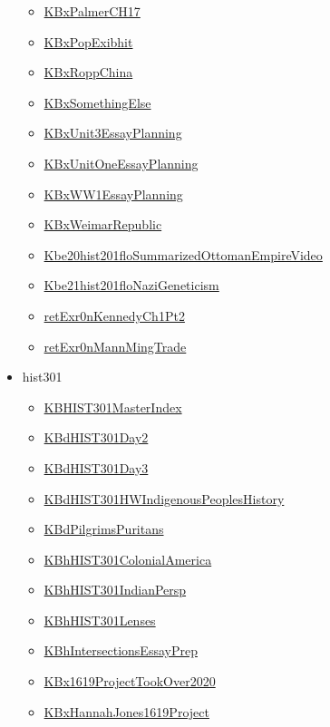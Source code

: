 \documentclass[11pt]{article}
\begin{document}
\begin{itemize}
\begin{itemize}
\item \href{hist201/KBxPalmerCH17.org}{KBxPalmerCH17}
\item \href{hist201/KBxPopExibhit.org}{KBxPopExibhit}
\item \href{hist201/KBxRoppChina.org}{KBxRoppChina}
\item \href{hist201/KBxSomethingElse.org}{KBxSomethingElse}
\item \href{hist201/KBxUnit3EssayPlanning.org}{KBxUnit3EssayPlanning}
\item \href{hist201/KBxUnitOneEssayPlanning.org}{KBxUnitOneEssayPlanning}
\item \href{hist201/KBxWW1EssayPlanning.org}{KBxWW1EssayPlanning}
\item \href{hist201/KBxWeimarRepublic.org}{KBxWeimarRepublic}
\item \href{hist201/Kbe20hist201floSummarizedOttomanEmpireVideo.org}{Kbe20hist201floSummarizedOttomanEmpireVideo}
\item \href{hist201/Kbe21hist201floNaziGeneticism.org}{Kbe21hist201floNaziGeneticism}
\item \href{hist201/retExr0nKennedyCh1Pt2.org}{retExr0nKennedyCh1Pt2}
\item \href{hist201/retExr0nMannMingTrade.org}{retExr0nMannMingTrade}
\end{itemize}
\item hist301
\begin{itemize}
\item \href{hist301/KBHIST301MasterIndex.org}{KBHIST301MasterIndex}
\item \href{hist301/KBdHIST301Day2.org}{KBdHIST301Day2}
\item \href{hist301/KBdHIST301Day3.org}{KBdHIST301Day3}
\item \href{hist301/KBdHIST301HWIndigenousPeoplesHistory.org}{KBdHIST301HWIndigenousPeoplesHistory}
\item \href{hist301/KBdPilgrimsPuritans.org}{KBdPilgrimsPuritans}
\item \href{hist301/KBhHIST301ColonialAmerica.org}{KBhHIST301ColonialAmerica}
\item \href{hist301/KBhHIST301IndianPersp.org}{KBhHIST301IndianPersp}
\item \href{hist301/KBhHIST301Lenses.org}{KBhHIST301Lenses}
\item \href{hist301/KBhIntersectionsEssayPrep.org}{KBhIntersectionsEssayPrep}
\item \href{hist301/KBx1619ProjectTookOver2020.org}{KBx1619ProjectTookOver2020}
\item \href{hist301/KBxHannahJones1619Project.org}{KBxHannahJones1619Project}

\end{itemize}
\end{itemize}
\end{document}
